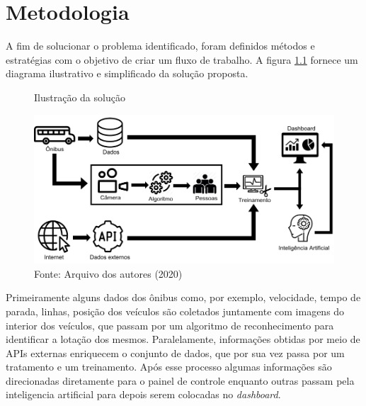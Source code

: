 \chapter{Metodologia}
\label{Cap:MateriaisMetodos}

\indent
\par A fim de solucionar o problema identificado, foram definidos métodos e estratégias com o objetivo de criar um fluxo de trabalho. A figura \ref{DiagramaDeBlocosIcones} fornece um diagrama ilustrativo e simplificado da solução proposta.

\begin{figure}[H]
    \centering
    \caption{Ilustração da solução}
    \includegraphics[width=1.0\linewidth]{Imagens/DiagramaDeBlocosIcones.png}
    \caption*{Fonte: Arquivo dos autores (2020)}
    \label{DiagramaDeBlocosIcones}
\end{figure}

\indent
\par Primeiramente alguns dados dos ônibus como, por exemplo, velocidade, tempo de parada, linhas, posição dos veículos são coletados juntamente com imagens do interior dos veículos, que passam por um algoritmo de reconhecimento para identificar a lotação dos mesmos. Paralelamente, informações obtidas por meio de APIs externas enriquecem o conjunto de dados, que por sua vez passa por um tratamento e um treinamento. Após esse processo algumas informações são direcionadas diretamente para o painel de controle enquanto outras passam pela inteligencia artificial para depois serem colocadas no \textit{dashboard}.

